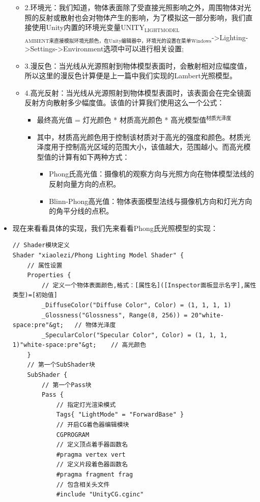 \documentclass[9pt, b5paper]{article}
\begin{document}
\begin{itemize}
\begin{itemize}
\item 2.环境光：我们知道，物体表面除了受直接光照影响之外，周围物体对光照的反射或散射也会对物体产生的影响，为了模拟这一部分影响，我们直接使用Unity内置的环境光变量UNITY$_{\text{LIGHTMODEL}}$$_{\text{AMBIENT来直接模拟环境光颜色，在Unity编辑器中，环境光的设置在菜单Windows}}$->Lighting->Settings->Environment选项中可以进行相关设置;
\item 3.漫反色：当光线从光源照射到物体模型表面时，会散射相对应幅度值，所以这里的漫反色计算便是上一篇中我们实现的Lambert光照模型。
\item 4.高光反射：当光线从光源照射到物体模型表面时，该表面会在完全镜面反射方向散射多少幅度值。该值的计算我们使用这么一个公式：
\begin{itemize}
\item 最终高光值 = 灯光颜色 * 材质高光颜色 * 高光模型值$^{\text{材质光泽度}}$
\item 其中，材质高光颜色用于控制该材质对于高光的强度和颜色。材质光泽度用于控制高光区域的范围大小，该值越大，范围越小。而高光模型值的计算有如下两种方式：
\begin{itemize}
\item Phong氏高光值：摄像机的观察方向与光照方向在物体模型法线的反射向量方向的点积。
\item Blinn-Phong高光值：物体表面模型法线与摄像机方向和灯光方向的角平分线的点积。
\end{itemize}
\end{itemize}
\end{itemize}
\item 现在来看看具体的实现，我们先来看看Phong氏光照模型的实现：
\begin{verbatim}
// Shader模块定义  
Shader "xiaolezi/Phong Lighting Model Shader" {  
    // 属性设置  
    Properties {  
        // 定义一个物体表面颜色,格式：[属性名]([Inspector面板显示名字],属性类型)=[初始值]  
        _DiffuseColor("Diffuse Color", Color) = (1, 1, 1, 1)  
        _Glossness("Glossness", Range(8, 256)) = 20"white-space:pre"&gt;   // 物体光泽度  
        _SpecularColor("Specular Color", Color) = (1, 1, 1, 1)"white-space:pre"&gt;    // 高光颜色  
    }  
    // 第一个SubShader块  
    SubShader {  
        // 第一个Pass块  
        Pass {  
            // 指定灯光渲染模式  
            Tags{ "LightMode" = "ForwardBase" }  
            // 开启CG着色器编辑模块  
            CGPROGRAM  
            // 定义顶点着手器函数名  
            #pragma vertex vert  
            // 定义片段着色器函数名  
            #pragma fragment frag  
            // 包含相关头文件  
            #include "UnityCG.cginc"      

\end{verbatim}
\end{itemize}
\end{document}
